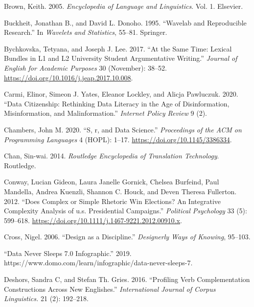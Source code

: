 \documentclass[
  letterpaper,
]{latex/krantz}
\newlength{\cslhangindent}
\newlength{\cslentryspacingunit} %
\newenvironment{CSLReferences}[2] %
 {%
  \setlength{\parindent}{0pt}
  \ifodd #1
  \let\oldpar\par
  \def\par{\hangindent=\cslhangindent\oldpar}
  \fi
  \setlength{\parskip}{#2\cslentryspacingunit}
 }%
 {}
\begin{document}
\begin{CSLReferences}{1}{0}
\leavevmode{}%
Brown, Keith. 2005. \emph{Encyclopedia of Language and Linguistics}.
Vol. 1. Elsevier.

\leavevmode{}%
Buckheit, Jonathan B., and David L. Donoho. 1995. {``Wavelab and
Reproducible Research.''} In \emph{Wavelets and Statistics}, 55--81.
Springer.

\leavevmode{}%
Bychkovska, Tetyana, and Joseph J. Lee. 2017. {``At the Same Time:
Lexical Bundles in L1 and L2 University Student Argumentative
Writing.''} \emph{Journal of English for Academic Purposes} 30
(November): 38--52. \url{https://doi.org/10.1016/j.jeap.2017.10.008}.

\leavevmode{}%
Carmi, Elinor, Simeon J. Yates, Eleanor Lockley, and Alicja Pawluczuk.
2020. {``Data Citizenship: Rethinking Data Literacy in the Age of
Disinformation, Misinformation, and Malinformation.''} \emph{Internet
Policy Review} 9 (2).

\leavevmode{}%
Chambers, John M. 2020. {``S, r, and Data Science.''} \emph{Proceedings
of the ACM on Programming Languages} 4 (HOPL): 1--17.
\url{https://doi.org/10.1145/3386334}.

\leavevmode{}%
Chan, Sin-wai. 2014. \emph{Routledge Encyclopedia of Translation
Technology}. Routledge.

\leavevmode{}%
Conway, Lucian Gideon, Laura Janelle Gornick, Chelsea Burfeind, Paul
Mandella, Andrea Kuenzli, Shannon C. Houck, and Deven Theresa Fullerton.
2012. {``Does Complex or Simple Rhetoric Win Elections? An Integrative
Complexity Analysis of u.s. Presidential Campaigns.''} \emph{Political
Psychology} 33 (5): 599--618.
\url{https://doi.org/10.1111/j.1467-9221.2012.00910.x}.

\leavevmode{}%
Cross, Nigel. 2006. {``Design as a Discipline.''} \emph{Designerly Ways
of Knowing}, 95--103.

\leavevmode{}%
{``Data Never Sleeps 7.0 Infographic.''} 2019.
https://www.domo.com/learn/infographic/data-never-sleeps-7.

\leavevmode{}%
Deshors, Sandra C, and Stefan Th. Gries. 2016. {``Profiling Verb
Complementation Constructions Across New Englishes.''}
\emph{International Journal of Corpus Linguistics.} 21 (2): 192--218.


\end{CSLReferences}
\end{document}
